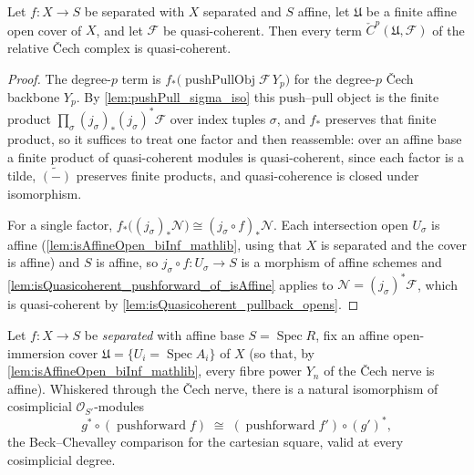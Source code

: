 \begin{lemma}\leanok
  \label{lem:isQuasicoherent_cechComplex_X}
  Let \(f : X \to S\) be separated with \(X\) separated and \(S\) affine, let
  \(\mathfrak{U}\) be a finite affine open cover of \(X\), and let \(\mathcal{F}\) be
  quasi-coherent. Then every term \(\check{C}^p(\mathfrak{U}, \mathcal{F})\) of the relative
  {\v C}ech complex is quasi-coherent.
\end{lemma}

\begin{proof}\leanok
  The degree-\(p\) term is \(f_*\bigl(\operatorname{pushPullObj}\mathcal{F}\,Y_p\bigr)\) for the
  degree-\(p\) {\v C}ech backbone \(Y_p\). By \cref{lem:pushPull_sigma_iso} this push--pull object
  is the finite product \(\prod_\sigma (j_\sigma)_*(j_\sigma)^*\mathcal{F}\) over index tuples
  \(\sigma\), and \(f_*\) preserves that finite product, so it suffices to treat one factor and
  then reassemble: over an affine base a finite product of quasi-coherent modules is
  quasi-coherent, since each factor is a tilde, \(\widetilde{(-)}\) preserves finite products, and
  quasi-coherence is closed under isomorphism.

  For a single factor, \(f_*\bigl((j_\sigma)_* \mathcal{N}\bigr) \cong (j_\sigma \circ f)_*
  \mathcal{N}\). Each intersection open \(U_\sigma\) is affine
  (\cref{lem:isAffineOpen_biInf_mathlib}, using that \(X\) is separated and the cover is affine)
  and \(S\) is affine, so \(j_\sigma \circ f : U_\sigma \to S\) is a morphism of affine schemes and
  \cref{lem:isQuasicoherent_pushforward_of_isAffine} applies to
  \(\mathcal{N} = (j_\sigma)^*\mathcal{F}\), which is quasi-coherent by
  \cref{lem:isQuasicoherent_pullback_opens}.
\end{proof}

\begin{lemma}\leanok
  \label{lem:cech_pushforward_baseChange_natIso}
  Let \(f : X \to S\) be \emph{separated} with affine base \(S = \operatorname{Spec} R\),
  fix an affine open-immersion cover \(\mathfrak{U} = \{U_i = \operatorname{Spec} A_i\}\) of
  \(X\) (so that, by \cref{lem:isAffineOpen_biInf_mathlib}, every fibre power \(Y_n\) of the
  {\v C}ech nerve is affine). Whiskered through the {\v C}ech nerve, there is a natural
  isomorphism of cosimplicial \(\mathcal{O}_{S'}\)-modules
  \[
    g^* \circ (\operatorname{pushforward} f) \;\cong\;
      (\operatorname{pushforward} f') \circ (g')^*,
  \]
  the Beck--Chevalley comparison for the cartesian square, valid at every cosimplicial
  degree.
\end{lemma}

